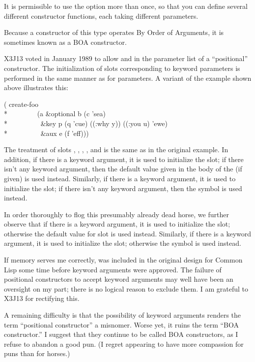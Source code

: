 It is permissible to use the
 option more than once, so that you can define several
different constructor functions, each taking different parameters.

Because a constructor of this type operates By Order of Arguments,
it is sometimes known as a BOA constructor.

\begin{new}
X3J13 voted in January 1989
to allow  and 
in the
parameter list of a ``positional'' constructor.  The initialization of slots
corresponding to keyword parameters
is performed in the same manner as for  parameters.
A variant of the example shown above illustrates this:
\begin{lisp}
( create-foo \\*
~~~~~~~~(a \&optional b (c 'sea) \\*
~~~~~~~~~\&key p (q 'cue) ((:why y)) ((:you u) 'ewe) \\*
~~~~~~~~~\&aux e (f 'eff)))
\end{lisp}
The treatment of slots , , , , and 
is the same as in the original example.  In addition,
if there is a  keyword argument, it is
used to initialize the  slot;  if there isn't any
 keyword argument, then the default value given in the body of the
 (if given) is used instead.  Similarly,
if there is a  keyword argument, it is
used to initialize the  slot;  if there isn't any
 keyword argument, then
the symbol  is used instead.

In order thoroughly to flog this presumably already dead horse,
we further observe that if there is a  keyword argument, it is
used to initialize the  slot; otherwise
the default value for slot  is used instead.  Similarly,
if there is a  keyword argument, it is
used to initialize the  slot;  otherwise
the symbol  is used instead.

If memory serves me correctly,  was included in the original
design for Common Lisp some time before keyword arguments were approved.
The failure of positional constructors to accept keyword arguments may well
have been an oversight on my part; there is no logical reason to exclude
them.  I am grateful to X3J13 for rectifying this.

A remaining difficulty is that the possibility of keyword arguments
renders the term ``positional constructor'' a misnomer.  Worse yet,
it ruins the term ``BOA constructor.''  I suggest that
they continue to be called BOA constructors, as I refuse to abandon
a good pun.  (I regret appearing to have more compassion for puns than
for horses.)


\end{new}
